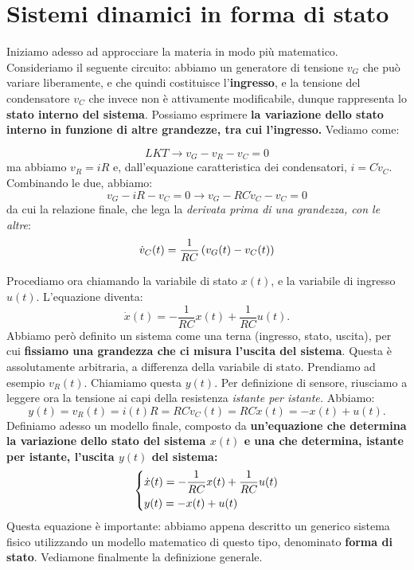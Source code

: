 \documentclass[a4paper]{report}
\begin{document}
\chapter{Sistemi dinamici in forma di stato}
Iniziamo adesso ad approcciare la materia in modo più matematico. Consideriamo il seguente circuito: abbiamo un generatore di tensione $v_G$ che può variare liberamente, e che quindi costituisce l'\textbf{ingresso}, e la tensione del condensatore $v_C$ che invece non è attivamente modificabile, dunque rappresenta lo \textbf{stato interno del sistema}. Possiamo esprimere \textbf{la variazione dello stato interno in funzione di altre grandezze, tra cui l'ingresso.} Vediamo come:
\bb
\begin{minipage}{0.4\textwidth}
\end{minipage}
\begin{minipage}{0.6\textwidth}
\begin{equation*}
	LKT \rightarrow v_G-v_R-v_C=0
\end{equation*}
ma abbiamo $v_R=iR$ e, dall'equazione caratteristica dei condensatori, $i=C \dot v_C$. Combinando le due, abbiamo:
\begin{equation*}
	v_G-iR-v_C=0 \rightarrow v_G-RC\dot v_C-v_C=0
\end{equation*}
da cui la relazione finale, che lega la \textit{derivata prima di una grandezza, con le altre}:
\begin{equation*}
	\dot v_C(t)=\frac{1}{RC}\left( v_G(t)-v_C(t) \right)
\end{equation*}
\end{minipage}
\bb
Procediamo ora chiamando la variabile di stato $x(t)$, e la variabile di ingresso $u(t)$. L'equazione diventa:
\begin{equation*}
	\dot x(t) = -\frac{1}{RC}x(t)+\frac{1}{RC}u(t).
\end{equation*}
Abbiamo però definito un sistema come una terna (ingresso, stato, uscita), per cui \textbf{fissiamo una grandezza che ci misura l'uscita del sistema}. Questa è assolutamente arbitraria, a differenza della variabile di stato. Prendiamo ad esempio $v_R(t)$. Chiamiamo questa $y(t)$. Per definizione di sensore, riusciamo a leggere ora la tensione ai capi della resistenza \textit{istante per istante. }Abbiamo:
\begin{equation*}
	y(t) = v_R(t) =i(t)R = RC\dot v_C(t)=RC\dot x(t)=-x(t)+u(t).
\end{equation*}
Definiamo adesso un modello finale, composto da \textbf{un'equazione che determina la variazione dello stato del sistema $x(t)$ e una che determina, istante per istante, l'uscita $y(t)$ del sistema:}
\begin{equation*}
\begin{dcases*}
	\dot x(t) = -\frac{1}{RC}x(t)+\frac{1}{RC}u(t) \\
	y(t) = -x(t)+u(t)
\end{dcases*}
\end{equation*}
Questa equazione è importante: abbiamo appena descritto un generico sistema fisico utilizzando un modello matematico di questo tipo, denominato \textbf{forma di stato}. Vediamone finalmente la definizione generale.
\end{document}
